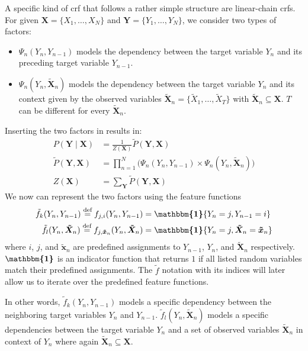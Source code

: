 A specific kind of \gls{crf} that follows a rather simple structure are \glspl{linear-chain crf}.
For given $\bm{X}=\{X_1,\dots,X_N\}$ and $\bm{Y}=\{Y_1,\dots,Y_N\}$, we consider two types of \glspl{factor}:
\begin{itemize}
  \item $\Psi_n(Y_n,Y_{n-1})$ models the dependency between the \gls{target variable} $Y_n$ and its preceding \gls{target variable} $Y_{n-1}$.
  \item $\Psi_n(Y_n,\bm{\tilde{X}}_n)$ models the dependency between the \gls{target variable} $Y_n$ and its context given by the \glspl{observed variable} $\bm{\tilde{X}}_n=\{\tilde{X}_1,\dots,\tilde{X}_T\}$ with $\bm{\tilde{X}}_n\subseteq\bm{X}$.
    $T$ can be different for every $\bm{\tilde{X}}_n$.
\end{itemize}
Inserting the two factors in  results in:
\begin{equation}
  \label{equ:linear-chain-crf-factor}
  \begin{split}
    P(\bm{Y}\mid\bm{X}) & = \frac{1}{Z(\bm{X})}\tilde{P}(\bm{Y},\bm{X}) \\
    \tilde{P}(\bm{Y},\bm{X}) &= \prod_{n=1}^{N}\Big(\Psi_n(Y_n,Y_{n-1})\times\Psi_n(Y_n,\bm{\tilde{X}}_n)\Big) \\
    Z(\bm{X}) & = \sum_{\bm{Y}}\tilde{P}(\bm{Y},\bm{X})
  \end{split}
\end{equation}
We now can represent the two \glspl{factor} using the \glspl{feature function}
\begin{equation}
  \label{equ:linear-chain-crf-feature-functions}
  \begin{split}
    \tilde{f}_k(Y_n,Y_{n-1})\equalsdef f_{j,i}(Y_n,Y_{n-1}) & = \bm{\mathbbm{1}}\{Y_n=j,Y_{n-1}=i\}\\
    \tilde{f}_l(Y_n,\bm{\tilde{X}}_n)\equalsdef f_{j,\bm{\tilde{x}}_n}( Y_n,\bm{\tilde{X}}_n) & = \bm{\mathbbm{1}}\{Y_n=j,\bm{\tilde{X}}_n=\bm{\tilde{x}}_n\}
  \end{split}
\end{equation}
where $i$, $j$, and $\bm{\tilde{x}}_n$ are predefined assignments to $Y_{n-1}$, $Y_n$, and $\bm{\tilde{X}}_n$ respectively. $\bm{\mathbbm{1}}$ is an indicator function that returns $1$ if all listed \glspl{random variable} match their predefined assignments.
The $\tilde{f}$ notation with its indices will later allow us to iterate over the predefined \glspl{feature function}.

In other words, $\tilde{f}_k(Y_n,Y_{n-1})$ models a specific dependency between the neighboring \glspl{target variable} $Y_n$ and $Y_{n-1}$. $\tilde{f}_l(Y_n,\bm{\tilde{X}}_n)$ models a specific dependencies between the \gls{target variable} $Y_n$ and a set of \glspl{observed variable} $\bm{\tilde{X}}_n$ in context of $Y_n$ where again $\bm{\tilde{X}}_n\subseteq\bm{X}$.

